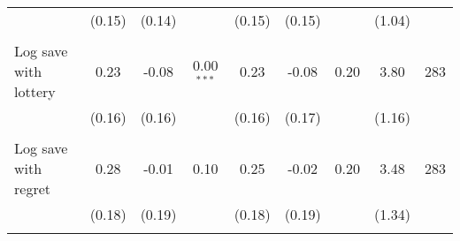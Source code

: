 \begin{table}[htbp]
{\begin{threeparttable}
\begin{tabular}{l*{8}{c}}
          &   (0.15)&   (0.14)&         &   (0.15)&   (0.15)&         &   (1.04)&         \\
          &         &         &         &         &         &         &         &         \\
Log save with lottery&     0.23&    -0.08&0.00$^{***}$&     0.23&    -0.08&     0.20&     3.80&      283\\
          &   (0.16)&   (0.16)&         &   (0.16)&   (0.17)&         &   (1.16)&         \\
          &         &         &         &         &         &         &         &         \\
Log save with regret&     0.28&    -0.01&     0.10&     0.25&    -0.02&     0.20&     3.48&      283\\
          &   (0.18)&   (0.19)&         &   (0.18)&   (0.19)&         &   (1.34)&         \\
          &         &         &         &         &         &         &         &         \\
\bottomrule \end{tabular} \begin{tablenotes}[flushleft] \footnotesize \item  \end{tablenotes} \end{threeparttable} } \end{table}
